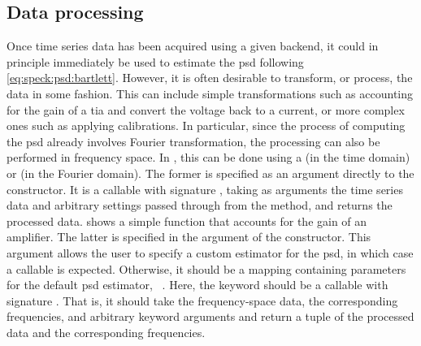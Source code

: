 \subsection{Data processing}\label{subsec:speck:software:design:processing}
Once time series data has been acquired using a given  backend, it could in principle immediately be used to estimate the \gls{psd} following \cref{eq:speck:psd:bartlett}.
However, it is often desirable to transform, or process, the data in some fashion.
This can include simple transformations such as accounting for the gain of a \gls{tia} and convert the voltage back to a current, or more complex ones such as applying calibrations.
In particular, since the process of computing the \gls{psd} already involves Fourier transformation, the processing can also be performed in frequency space.
In \pyspeck, this can be done using a  (in the time domain) or  (in the Fourier domain).
The former is specified as an argument directly to the  constructor.
It is a callable with signature , taking as arguments the time series data and arbitrary settings passed through from the  method, and returns the processed data.
 shows a simple function that accounts for the gain of an amplifier.
The latter is specified in the  argument of the  constructor.
This argument allows the user to specify a custom estimator for the \gls{psd}, in which case a callable is expected.
Otherwise, it should be a mapping containing parameters for the default \gls{psd} estimator, ~\cite{WelchScipy}.
Here, the keyword  should be a callable with signature .
That is, it should take the frequency-space data, the corresponding frequencies, and arbitrary keyword arguments and return a tuple of the processed data and the corresponding frequencies.

